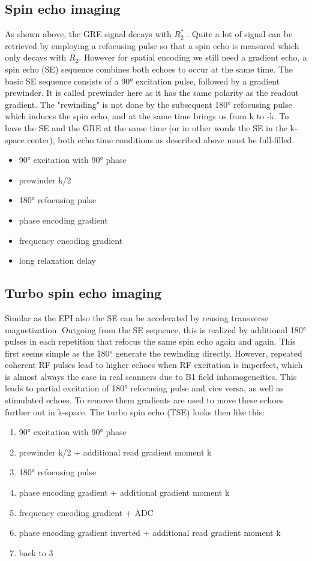 \documentclass[a4paper,12pt]{extarticle}
\begin{document}
\subsection{Spin echo imaging}
As shown above, the GRE signal decays with $R_2^*$ . Quite a lot of signal can be retrieved by employing a refocusing pulse so that a spin echo is measured which only decays with $R_2$.
However for spatial encoding we still need a gradient echo, a spin echo (SE) sequence combines both echoes to occur at the same time. The basic SE sequence consists of a 90° excitation pulse, followed by a gradient prewinder. It is called prewinder here as it has the same polarity as the readout gradient. The "rewinding" is not done by the subsequent 180° refocusing pulse which induces the spin echo, and at the same time brings us from k to -k. To have the SE and the GRE at the same time (or in other words the SE in the k-space center), both echo time conditions as described above must be full-filled.

\begin{itemize}
\item 90° excitation with 90° phase 
\item prewinder k/2
\item 180° refocusing pulse
\item phase encoding gradient 
\item frequency encoding gradient
\item long relaxation delay 
\end{itemize}

\subsection{Turbo spin echo imaging}
Similar as the EPI also the SE can be accelerated by reusing transverse magnetization.
Outgoing from the SE sequence, this is realized by additional 180° pulses in each repetition that refocus the same spin echo again and again. This first seems simple as the 180° generate the rewinding directly. However, repeated coherent RF pulses lead to higher echoes when RF excitation is imperfect, which is almost always the case in real scanners due to B1 field inhomogeneities. This leads to partial excitation of 180° refocusing pulse and vice versa, as well as stimulated echoes. To remove them gradients are used to move these echoes further out in k-space. The turbo spin echo (TSE) looks then like this:
\begin{enumerate}
\item 90° excitation with 90° phase 
\item prewinder k/2 + additional read gradient moment k
\item  180° refocusing pulse
\item  phase encoding gradient + additional gradient moment k
\item frequency encoding gradient + ADC
\item phase encoding gradient inverted + additional read gradient moment k
\item  back to 3 
\end{enumerate}
\end{document}
